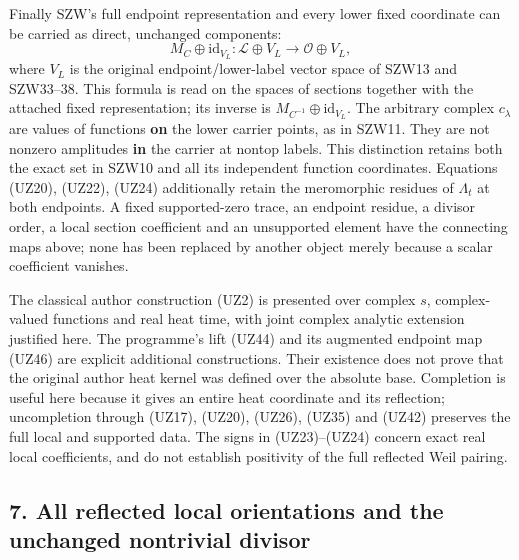 \documentclass[
  10pt,
  a4paper,
]{article}
\begin{document}
Finally SZW's full endpoint representation and every lower fixed
coordinate can be carried as direct, unchanged components: \[
M_C\oplus\mathrm{id}_{V_L}:
\mathcal L\oplus V_L\longrightarrow\mathcal O\oplus V_L,
\tag{UZ46}
\] where \(V_L\) is the original endpoint/lower-label vector space of
SZW13 and SZW33--38. This formula is read on the spaces of sections
together with the attached fixed representation; its inverse is
\(M_{C^{-1}}\oplus\mathrm{id}_{V_L}\). The arbitrary complex
\(c_\lambda\) are values of functions \textbf{on} the lower carrier
points, as in SZW11. They are not nonzero amplitudes \textbf{in} the
carrier at nontop labels. This distinction retains both the exact set in
SZW10 and all its independent function coordinates. Equations (UZ20),
(UZ22), (UZ24) additionally retain the meromorphic residues of
\(\Lambda_t\) at both endpoints. A fixed supported-zero trace, an
endpoint residue, a divisor order, a local section coefficient and an
unsupported element have the connecting maps above; none has been
replaced by another object merely because a scalar coefficient vanishes.

The classical author construction (UZ2) is presented over complex \(s\),
complex-valued functions and real heat time, with joint complex analytic
extension justified here. The programme's lift (UZ44) and its augmented
endpoint map (UZ46) are explicit additional constructions. Their
existence does not prove that the original author heat kernel was
defined over the absolute base. Completion is useful here because it
gives an entire heat coordinate and its reflection; uncompletion through
(UZ17), (UZ20), (UZ26), (UZ35) and (UZ42) preserves the full local and
supported data. The signs in (UZ23)--(UZ24) concern exact real local
coefficients, and do not establish positivity of the full reflected Weil
pairing.

\subsection{7. All reflected local orientations and the unchanged
nontrivial
divisor}\label{all-reflected-local-orientations-and-the-unchanged-nontrivial-divisor}
\end{document}

